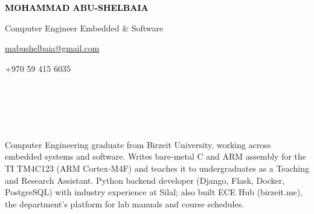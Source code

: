 \documentclass[9pt]{developercv} %
\begin{document}

\begin{minipage}[t]{0.6\textwidth}
	\vspace{-\baselineskip} %
	
	{ \fontsize{16}{20} \textcolor{black}{\textbf{\MakeUppercase{Mohammad Abu-Shelbaia}}}} %
	
	\vspace{4pt}
	
	{\large Computer Engineer \textperiodcentered{} Embedded \& Software}
	
	\vspace{6pt}
	
	{\Large \href{mailto:mabushelbaia@gmail.com}{mabushelbaia@gmail.com}} 
 
	\vspace{6pt}
	
{\Large +970 59 415 6035} 
\end{minipage}
\hfill
\begin{minipage}[t]{0.31\textwidth} %
	\vspace{-\baselineskip} %
	
	\\ 
    \\
    \\
    \\
    
\end{minipage}



Computer Engineering graduate from Birzeit University, working across embedded systems and software. Writes bare-metal C and ARM assembly for the TI TM4C123 (ARM Cortex-M4F) and teaches it to undergraduates as a Teaching and Research Assistant. Python backend developer (Django, Flask, Docker, PostgreSQL) with industry experience at Silal; also built ECE Hub (birzeit.me), the department's platform for lab manuals and course schedules.
\end{document}
